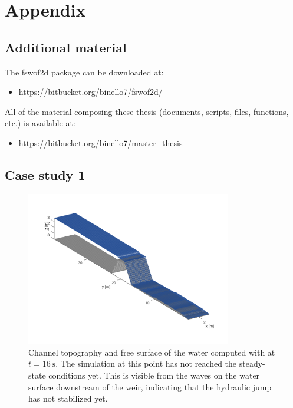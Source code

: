 \chapter{Appendix}


\section{Additional material}\label{sec:additional_material}
\noindent The  fswof2d package can be downloaded at:
\begin{itemize}
\itemsep0em
  \item \url{https://bitbucket.org/binello7/fswof2d/}
\end{itemize}


\noindent All of the material composing these thesis (documents, scripts, files, functions, etc.) is available at:
\begin{itemize}
\itemsep0em
  \item \url{https://bitbucket.org/binello7/master_thesis}
\end{itemize}



\section{Case study 1}
\begin{figure}[H]
  \centering
  \includegraphics[width=0.8\textwidth]{Figures/channel.png}
  \caption{Channel topography and free surface of the water computed with  at $t = \SI{16}{\s}$. The simulation at this point has not reached the steady-state conditions yet. This is visible from the waves on the water surface downstream of the weir, indicating that the hydraulic jump has not stabilized yet.}
  \label{fig:channel}
\end{figure}




